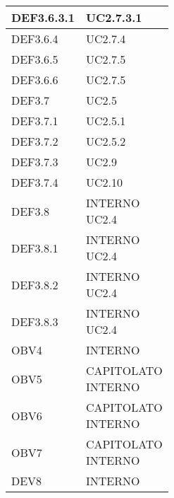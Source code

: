 \documentclass{scalatekids-article}
\begin{document}
\begin{longtable}[H]{|p{5.5cm}|p{5.5cm}|}
  \hline
  DEF3.6.3.1 & \multiLineCell[t]{UC2.7.3.1\\}\\
  \hline
  DEF3.6.4 & \multiLineCell[t]{UC2.7.4\\}\\
  \hline
  DEF3.6.5 & \multiLineCell[t]{UC2.7.5\\}\\
  \hline
  DEF3.6.6 & \multiLineCell[t]{UC2.7.5\\}\\
  \hline
  DEF3.7 & \multiLineCell[t]{UC2.5\\}\\
  \hline
  DEF3.7.1 & \multiLineCell[t]{UC2.5.1\\}\\
  \hline
  DEF3.7.2 & \multiLineCell[t]{UC2.5.2\\}\\
  \hline
  DEF3.7.3 & \multiLineCell[t]{UC2.9\\}\\
  \hline
  DEF3.7.4 & \multiLineCell[t]{UC2.10\\}\\
  \hline
  DEF3.8 & \multiLineCell[t]{INTERNO\\UC2.4\\}\\
  \hline
  DEF3.8.1 & \multiLineCell[t]{INTERNO\\UC2.4\\}\\
  \hline
  DEF3.8.2 & \multiLineCell[t]{INTERNO\\UC2.4\\}\\
  \hline
  DEF3.8.3 & \multiLineCell[t]{INTERNO\\UC2.4\\}\\
  OBV4 & \multiLineCell[t]{INTERNO\\}\\
  \hline
  OBV5 & \multiLineCell[t]{CAPITOLATO\\INTERNO\\}\\
  \hline
  OBV6 & \multiLineCell[t]{CAPITOLATO\\INTERNO\\}\\
  \hline
  OBV7 & \multiLineCell[t]{CAPITOLATO\\INTERNO\\}\\
  \hline
  DEV8 & \multiLineCell[t]{INTERNO\\}\\

\end{longtable}
\end{document}
